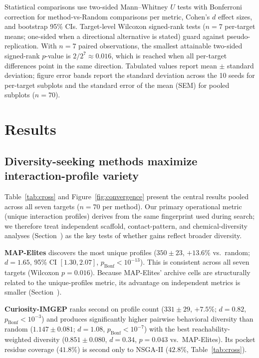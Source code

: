 \documentclass[journal=jcisd8,manuscript=article]{achemso}
\begin{document}
Statistical comparisons use two-sided Mann--Whitney $U$ tests with Bonferroni correction for method-vs-Random comparisons per metric, Cohen's $d$ effect sizes, and bootstrap 95\% CIs. Target-level Wilcoxon signed-rank tests ($n = 7$ per-target means; one-sided when a directional alternative is stated) guard against pseudo-replication. With $n = 7$ paired observations, the smallest attainable two-sided signed-rank $p$-value is $2/2^{7} \approx 0.016$, which is reached when all per-target differences point in the same direction. Tabulated values report mean $\pm$ standard deviation; figure error bands report the standard deviation across the 10 seeds for per-target subplots and the standard error of the mean (SEM) for pooled subplots ($n = 70$).


\section{Results}

\subsection{Diversity-seeking methods maximize interaction-profile variety}

Table~\ref{tab:cross} and Figure~\ref{fig:convergence} present the central results pooled across all seven targets ($n = 70$ per method). Our primary operational metric (unique interaction profiles) derives from the same fingerprint used during search; we therefore treat independent scaffold, contact-pattern, and chemical-diversity analyses (Section~) as the key tests of whether gains reflect broader diversity.

\textbf{MAP-Elites} discovers the most unique profiles ($350 \pm 23$, $+13.6\%$ vs.\ random; $d = 1.65$, 95\% CI $[1.30, 2.07]$, $p_\text{Bonf} < 10^{-13}$). This is consistent across all seven targets (Wilcoxon $p = 0.016$). Because MAP-Elites' archive cells are structurally related to the unique-profiles metric, its advantage on independent metrics is smaller (Section~).

\textbf{Curiosity-IMGEP} ranks second on profile count ($331 \pm 29$, $+7.5\%$; $d = 0.82$, $p_\text{Bonf} < 10^{-3}$) and produces significantly higher pairwise behavioral diversity than random ($1.147 \pm 0.081$; $d = 1.08$, $p_\text{Bonf} < 10^{-7}$) with the best reachability-weighted diversity ($0.851 \pm 0.080$, $d = 0.34$, $p = 0.043$ vs.\ MAP-Elites). Its pocket residue coverage ($41.8\%$) is second only to NSGA-II ($42.8\%$, Table~\ref{tab:cross}).
\end{document}
